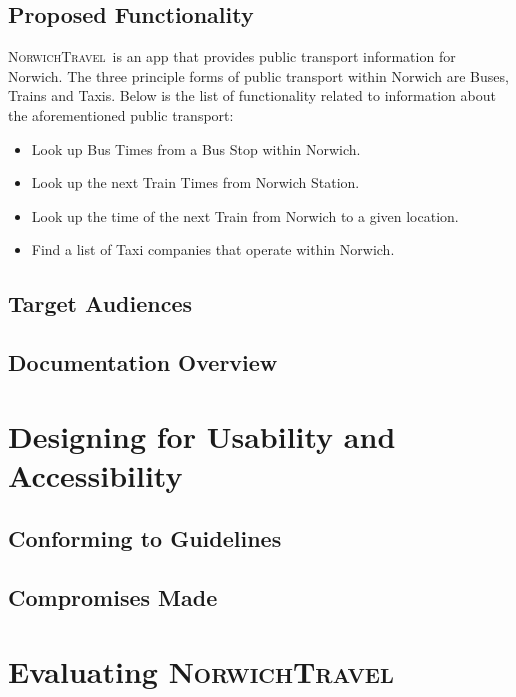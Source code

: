 \documentclass[cmpstyle]{ueacmpstyle}
\newcommand{\nt}{\textsc{NorwichTravel}}
\begin{document}
		\subsection{Proposed Functionality} \label{sec:prop-func}
		\nt \ is an app that provides public transport information for Norwich. The three principle forms of public transport within Norwich are Buses, Trains and Taxis. Below is the list of functionality related to information about the aforementioned public transport:
			\begin{itemize}
				\item Look up Bus Times from a Bus Stop within Norwich.
				\item Look up the next Train Times from Norwich Station.
				\item Look up the time of the next Train from Norwich to a given location.
				\item Find a list of Taxi companies that operate within Norwich. 
			\end{itemize} 
		
		\subsection{Target Audiences} \label{sec:target}
		
		\subsection{Documentation Overview} \label{sec:doc-over}
	\section{Designing for Usability and Accessibility} \label{sec:design}
	
		\subsection{Conforming to Guidelines} \label{sec:conform}
		
		\subsection{Compromises Made} \label{sec:comp}
	\section{Evaluating \nt} \label{sec:eval}
	
\end{document}
